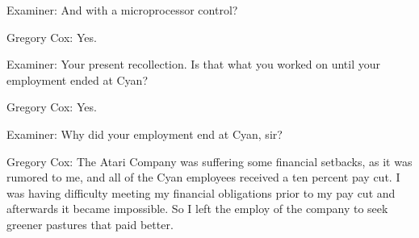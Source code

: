 \textcolor{interviewer}{Examiner:} And with a microprocessor control? 

\textcolor{interviewee}{Gregory Cox:} Yes. 

\textcolor{interviewer}{Examiner:} Your present recollection. Is that what you worked on until your employment ended at Cyan? 

\textcolor{interviewee}{Gregory Cox:} Yes. 

\textcolor{interviewer}{Examiner:} Why did your employment end at Cyan, sir? 

\textcolor{interviewee}{Gregory Cox:} The Atari Company was suffering some financial setbacks, as it was rumored to me, and all of the Cyan employees received a ten percent pay cut. I was having difficulty meeting my financial obligations prior to my pay cut and afterwards it became impossible. So I left the employ of the company to seek greener pastures that paid better.